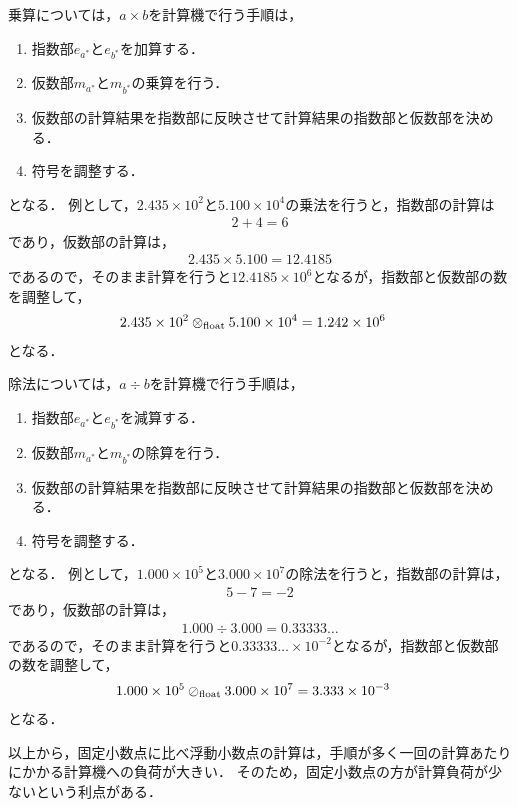 乗算については，$a \times b$を計算機で行う手順は，
\begin{enumerate}
    \item 指数部$e_{a^{\ast}}$と$e_{b^{\ast}}$を加算する．
    \item 仮数部$m_{a^{\ast}}$と$m_{b^{\ast}}$の乗算を行う．
    \item 仮数部の計算結果を指数部に反映させて計算結果の指数部と仮数部を決める．
    \item 符号を調整する．
\end{enumerate}
となる．
例として，$2.435 \times 10^2$と$5.100 \times 10^4$の乗法を行うと，指数部の計算は
\begin{align*}
    2 + 4 = 6
\end{align*}
であり，仮数部の計算は，
\begin{align*}
    2.435 \times 5.100 = 12.4185
\end{align*}
であるので，そのまま計算を行うと$12.4185 \times 10^6$となるが，指数部と仮数部の数を調整して，
\begin{align*}
    2.435 \times 10^2 \otimes_{\mathrm{float}} 5.100 \times 10^4 &= 1.242 \times 10^6
\end{align*}
となる．

除法については，$a \div b$を計算機で行う手順は，
\begin{enumerate}
    \item 指数部$e_{a^{\ast}}$と$e_{b^{\ast}}$を減算する．
    \item 仮数部$m_{a^{\ast}}$と$m_{b^{\ast}}$の除算を行う．
    \item 仮数部の計算結果を指数部に反映させて計算結果の指数部と仮数部を決める．
    \item 符号を調整する．
\end{enumerate}
となる．
例として，$1.000 \times 10^5$と$3.000 \times 10^7$の除法を行うと，指数部の計算は，
\begin{align*}
    5 - 7 = -2
\end{align*}
であり，仮数部の計算は，
\begin{align*}
    1.000 \div 3.000 = 0.33333\dots
\end{align*}
であるので，そのまま計算を行うと$0.33333\dots \times 10^{-2}$となるが，指数部と仮数部の数を調整して，
\begin{align*}
    1.000 \times 10^5 \oslash_{\mathrm{float}} 3.000 \times 10^7 &= 3.333 \times 10^{-3}
\end{align*}
となる．

以上から，固定小数点に比べ浮動小数点の計算は，手順が多く一回の計算あたりにかかる計算機への負荷が大きい．
そのため，固定小数点の方が計算負荷が少ないという利点がある．
